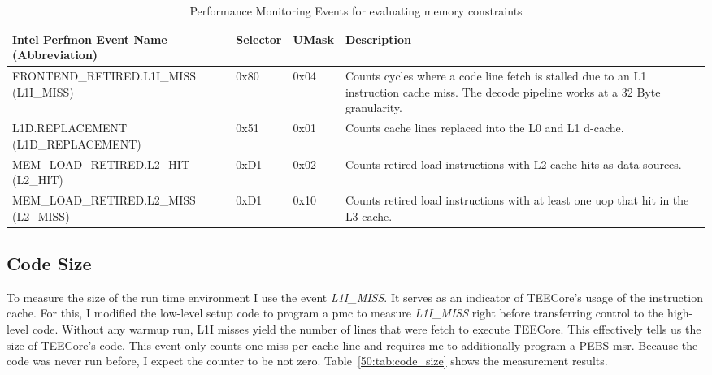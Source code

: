 \begin{table}[ht]
  \centering
  \begin{tabular}{ |p{6cm}|p{1.35cm}|p{1.25cm}|p{4cm}|}
    \hline
    \makecell[l]{Intel Perfmon Event Name \\ (Abbreviation)} & Selector & UMask & Description                                                                      \\
    \hline
    \makecell[l]{FRONTEND\_RETIRED.L1I\_MISS\\ (L1I\_MISS)}  & 0x80     & 0x04  & Counts cycles where a code line fetch is stalled due to an L1 instruction cache miss. The decode pipeline works at a 32 Byte granularity. \\
    \makecell[l]{L1D.REPLACEMENT \\ (L1D\_REPLACEMENT)}      & 0x51     & 0x01  & Counts cache lines replaced into the L0 and L1 d-cache.                          \\
    MEM\_LOAD\_RETIRED.L2\_HIT (L2\_HIT)                     & 0xD1     & 0x02  & Counts retired load instructions with L2 cache hits as data sources.             \\
    MEM\_LOAD\_RETIRED.L2\_MISS (L2\_MISS)                   & 0xD1     & 0x10  & Counts retired load instructions with at least one uop that hit in the L3 cache. \\
    \hline
  \end{tabular}
  \caption{Performance Monitoring Events for evaluating memory constraints}
  \label{50:tab:events}
\end{table}
\FloatBarrier

\subsection{Code Size}
\label{sec:evaluation:mem:code}
To measure the size of the run time environment I use the event
\textit{L1I\_MISS}. It serves as an indicator of TEECore's usage of the
instruction cache. For this, I modified the low-level setup code to program a
\gls{pmc} to measure \textit{L1I\_MISS} right before transferring control to the
high-level code. Without any warmup run, L1I misses yield the number of lines
that were fetch to execute TEECore. This effectively tells us the size of
TEECore's code. This event only counts one miss per cache line and requires me
to additionally program a PEBS \gls{msr}. Because the code was never run before,
I expect the counter to be not zero. Table~\ref{50:tab:code_size} shows the
measurement results.

